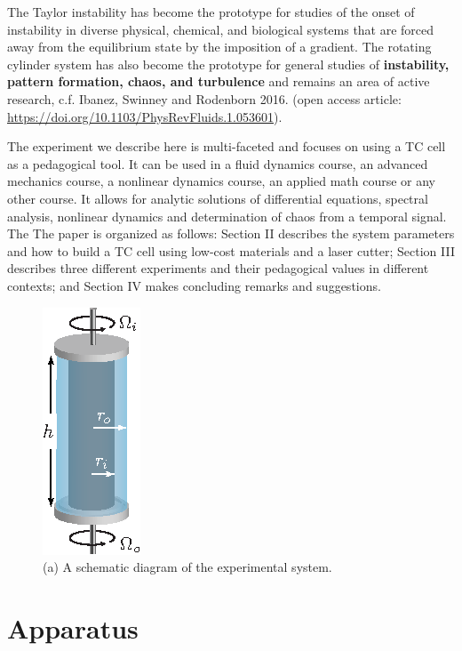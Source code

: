 \documentclass[%
 amsmath,amssymb,
 aps,
floatfix,
aps,prd,longbibliography,
notitlepage
]{revtex4-1}
\begin{document}
The Taylor instability has become the prototype for studies of the onset of instability in diverse physical, chemical, and biological systems that are forced away from the equilibrium state by the imposition of a gradient.  The rotating cylinder system has also become the prototype for general studies of {\bf instability, pattern formation, chaos, and turbulence} and remains an area of active research, c.f. Ibanez, Swinney and Rodenborn 2016. (open access article: \url{https://doi.org/10.1103/PhysRevFluids.1.053601}).  

The experiment we describe here is multi-faceted and focuses on using a TC cell as a pedagogical tool. It can be used in a fluid dynamics course, an advanced mechanics course, a nonlinear dynamics course, an applied math course or any other course.  It allows for analytic solutions of differential equations, spectral analysis, nonlinear dynamics and determination of chaos from a temporal signal. The  The paper is organized as follows: Section II describes the system parameters and how to build a TC cell using low-cost materials and a laser cutter; Section III describes three different experiments and their pedagogical values in different contexts; and Section IV makes concluding remarks and suggestions.


\begin{figure}[ht]
  \centering
    \includegraphics[width=.15\columnwidth]{Figures/1_Apparatus.eps}
    \caption{(a) A schematic diagram of the experimental system.}\label{fig:schematic}
\end{figure}

\section{Apparatus}
\end{document}
